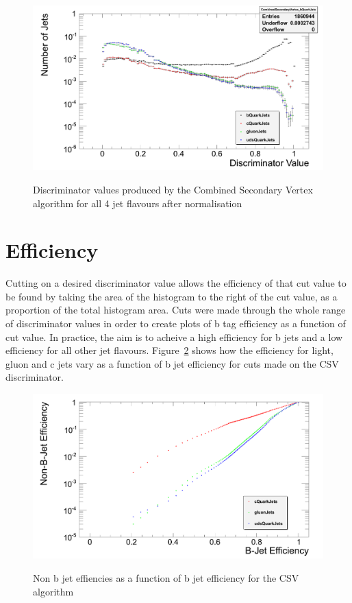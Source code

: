 \begin{figure}[hbtp]
   \centering
     \includegraphics[width=\textwidth]{Chapters/04_Analysis/04a_BTags/Images/CombinedSecondaryVertex_discriminator_combined}\\
     \caption{Discriminator values produced by the Combined Secondary Vertex algorithm for all 4 jet flavours after normalisation}
     \label{fig:CSV_discriminators}
\end{figure}

\section{Efficiency}
\label{s:efficiency}

Cutting on a desired discriminator value allows the efficiency of that cut value to be found by taking the
area of the histogram to the right of the cut value, as a proportion of the total histogram area. Cuts were
made through the whole range of discriminator values in order to create plots of b tag efficiency as a
function of cut value. In practice, the aim is to acheive a high efficiency for b jets and a low efficiency
for all other jet flavours. Figure~\ref{fig:jet_efficiencies} shows how the efficiency for light, gluon and c
jets vary as a function of b jet efficiency for cuts made on the CSV discriminator.

\begin{figure}[hbtp]
   \centering
     \includegraphics[width=\textwidth]{Chapters/04_Analysis/04a_BTags/Images/CombinedSecondaryVertex_nonBJetEfficiency_v_BJetEfficiency}\\
     \caption{Non b jet effiencies as a function of b jet efficiency for the CSV algorithm}
     \label{fig:jet_efficiencies}
\end{figure}

